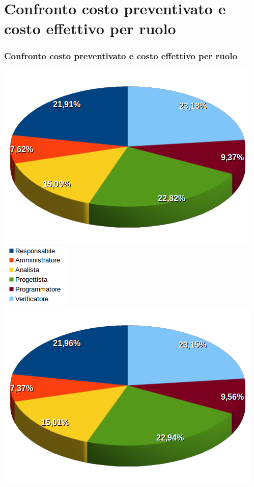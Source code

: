 \section{Confronto costo preventivato e costo effettivo per ruolo}
\begin{frame}
	\frametitle{Confronto costo preventivato e costo effettivo per ruolo}	
	\begin{center}
		\includegraphics[scale=0.23]{img/costoPREVENTIVATOperruolo.png}
		\qquad
		\includegraphics[scale=0.43]{img/legenda.png}
		\qquad
		\includegraphics[scale=0.23]{img/costoEFFETTIVOperruolo.png}	
	\end{center}
	
	
\end{frame}


